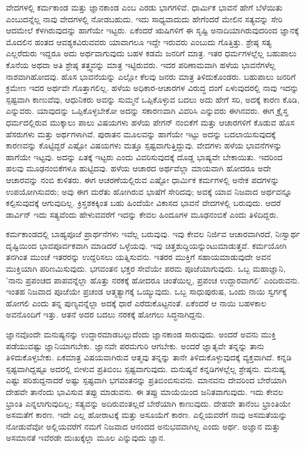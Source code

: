 \newpage

ವೇದಗಳಲ್ಲಿ ಕರ್ಮಕಾಂಡ ಮತ್ತು ಜ್ಞಾನಕಾಂಡ ಎಂಬ ಎರಡು ಭಾಗಗಳಿವೆ. ಧಾರ್ಮಿಕ ಭಾವನೆ ಹೇಗೆ ಬೆಳೆಯಿತು ಎಂಬುದನ್ನೆಲ್ಲ ನಾವು ವೇದಗಳಲ್ಲಿ ನೋಡಬಹುದು. ಇದು ಸಾಧ್ಯವಾದುದು ಹೇಗೆಂದರೆ ಮೇಲಿನ ಸತ್ಯವನ್ನು ಸೇರಿ ಆದಮೇಲೆ ಕೆಳಗಿರುವುದನ್ನು ಹಾಗೆಯೇ ಇಟ್ಟರು. ಏಕೆಂದರೆ ಋಷಿಗಳಿಗೆ ಈ ಸೃಷ್ಟಿ ಅನಾದಿಯಾಗಿರುವುದರಿಂದ ಜ್ಞಾನಕ್ಕೆ ಮೊದಲಿನ ಹಂತದ ಆವಶ್ಯಕವಿರುವವರು ಯಾವಾಗಲೂ ಇದ್ದೇ ಇರುವರು ಎಂಬುದು ಗೊತ್ತಿತ್ತು. ಶ್ರೇಷ್ಠ ಸತ್ಯ ಎಲ್ಲರೆದುರು ಇದ್ದರೂ ಅದು ಅರ್ಥವಾಗುವುದು ಬಹಳ ಕಡಮೆ ಜನರಿಗೆ ಮಾತ್ರ. ಇತರ ಧರ್ಮಗಳಲ್ಲೆಲ್ಲ ಬಹುಪಾಲು ಕೊನೆಯ ಅಥವಾ ಅತಿ ಶ್ರೇಷ್ಠ ತತ್ತ್ವವನ್ನು ಮಾತ್ರ ಇಟ್ಟಿರುವರು. ಇದರ ಪರಿಣಾಮವಾಗಿ ಹಳೆಯ ಭಾವನೆಗಳೆಲ್ಲ ನಾಶವಾಗಿಹೋದವು. ಹೊಸ ಭಾವನೆಯನ್ನು ಎಲ್ಲೋ ಕೆಲವು ಜನರು ಮಾತ್ರ ತಿಳಿದುಕೊಂಡರು. ಬಹುಪಾಲು ಜನರಿಗೆ ಕ್ರಮೇಣ ಇದರ ಅರ್ಥವೇ ಗೊತ್ತಾಗಲಿಲ್ಲ. ಹಳೆಯ ಅಧಿಕಾರ-ಆಚಾರಗಳ ವಿರುದ್ಧ ದಂಗೆ ಏಳುವುದರಲ್ಲಿ ನಾವು ಇದನ್ನು ಸ್ಪಷ್ಟವಾಗಿ ಕಾಣುವೆವು, ಆಧುನಿಕರು ಅವನ್ನು ಸುಮ್ಮನೆ ಒಪ್ಪಿಕೊಳ್ಳುವ ಬದಲು ಅದು ಹೇಗೆ ಸರಿ, ಅದಕ್ಕೆ ಕಾರಣ ಕೊಡಿ, ಎನ್ನುವರು. ಯಾವುದನ್ನು ಒಪ್ಪಿಕೊಳ್ಳಬೇಕೋ ಅದನ್ನು ಸಕಾರಣವಾಗಿ ವಿವರಿಸಿ ಎನ್ನುವರು ಈಗಿನವರು. ಈಗ ಕ್ರೈಸ್ತ ಧರ್ಮದಲ್ಲಿರುವ ಮುಕ್ಕಾಲು ಪಾಲು ವಿಷಯಗಳು ಹಳೆಯ ಪೇಗನ್ ನಂಬಿಕೆಗೆ ಮತ್ತು ಆಚಾರಗಳಿಗೆ ಕೊಡುವ ಹೊಸ ಹೆಸರುಗಳು ಮತ್ತು ಅರ್ಥಗಳಾಗಿವೆ. ಪುರಾತನ ಮೂಲವನ್ನು ಹಾಗೆಯೇ ಇಟ್ಟು ಅದನ್ನು ಬದಲಾಯಿಸುವುದಕ್ಕೆ ಕಾರಣವನ್ನು ಕೊಟ್ಟಿದ್ದರೆ ಎಷ್ಟೋ ವಿಷಯಗಳು ಮತ್ತೂ ಸ್ಪಷ್ಟವಾಗುತ್ತಿದ್ದುವು. ವೇದಗಳು ಹಳೆಯ ಭಾವನೆಗಳನ್ನು ಹಾಗೆಯೇ ಇಟ್ಟವು. ಅದನ್ನು ಏತಕ್ಕೆ ಇಟ್ಟರು ಎಂದು ವಿವರಿಸುವುದಕ್ಕೆ ದೊಡ್ಡ ಭಾಷ್ಯವೇ ಬೇಕಾಯಿತು. ಇದರಿಂದ ಹಲವು ಮೂಢನಂಬಿಕೆಗಳೂ ಹುಟ್ಟಿದವು. ಹಳೆಯ ಆಚಾರದ ಅರ್ಥವೆಲ್ಲಾ ಮಾಯವಾಗಿ ಹೋದರೂ ಅದೇ ಆಚಾರವನ್ನು ನಂಬಿ ಕುಳಿತರು. ಈಗ ಆಚರಣೆಯಲ್ಲಿರುವ ಎಷ್ಟೋ ಧಾರ್ಮಿಕ ಕರ್ಮಗಳಲ್ಲಿ ಅನೇಕ ಪದಗಳನ್ನು ಉಪಯೋಗಿಸುವರು; ಅವು ಈಗ ಮರೆತು ಹೋಗಿರುವ ಭಾಷೆಗೆ ಸೇರಿದವು; ಅವಕ್ಕೆ ಯಾವ ನಿಜವಾದ ಅರ್ಥವನ್ನೂ ಕಲ್ಪಿಸುವುದಕ್ಕೆ ಆಗುವುದಿಲ್ಲ. ಕ್ರಿಸ್ತಶಕಕ್ಕಿಂತ ಬಹು ಹಿಂದೆಯೇ ವಿಕಾಸದ ಭಾವನೆ ವೇದಗಳಲ್ಲಿ ಬರುವುದು. ಆದರೆ ಡಾರ್ವಿನ್ ಇದು ಸತ್ಯವೆಂದು ಹೇಳುವವರೆಗೆ ಇದನ್ನು ಕೇವಲ ಹಿಂದೂಗಳ ಮೂಢನಂಬಿಕೆ ಎಂದು ತಿಳಿದಿದ್ದರು.

ಕರ್ಮಕಾಂಡದಲ್ಲಿ ಬಾಹ್ಯಪೂಜೆ ಪ್ರಾರ್ಥನೆಗಳು ಇವೆಲ್ಲ ಬರುವುವು. ಇವು ಕೇವಲ ನಿರ್ಜಿವ ಆಚಾರವಾಗಿರದೆ, ನಿಃಸ್ವಾರ್ಥ ದೃಷ್ಟಿಯಿಂದ ಭಾವಪೂರ್ವಕವಾಗಿ ಮಾಡಿದರೆ ಒಳ್ಳೆಯವು. ಇವು ಚಿತ್ತಶುದ್ದಿಯನ್ನುಂಟುಮಾಡುತ್ತವೆ. ಕರ್ಮಯೋಗಿ ತನಗಿಂತ ಮುಂಚೆ ಇತರರನ್ನು ಉದ್ದರಿಸಲು ಯತ್ನಿಸುವನು. ಇತರರ ಮುಕ್ತಿಗೆ ಸಹಾಯಮಾಡುವುದೇ ಅವನ ಮುಕ್ತಿಯಾಗಿ ಪರಿಣಮಿಸುವುದು. ಭಗವಂತನ ಭಕ್ತರ ಸೇವೆಯೇ ಪರಮ ಪೂಜೆಯಾಗುವುದು. ಒಬ್ಬ ಮಹಾಜ್ಞಾನಿ, 'ನಾನು ಪ್ರಪಂಚದ ಪಾಪವನ್ನೆಲ್ಲಾ ಹೊತ್ತು ನರಕಕ್ಕೆ ಹೋದರೂ ಚಿಂತೆಯಿಲ್ಲ, ಪ್ರಪಂಚ ಉದ್ದಾರವಾಗಲಿ' ಎಂದಿರುವನು. ಇಂತಹ ನಿಜವಾದ ಪೂಜೆಯೇ ಪ್ರಚಂಡ ಆತ್ಮತ್ಯಾಗಕ್ಕೆ ಒಯ್ಯುವುದು. ಒಬ್ಬ ಸಾಧುಪುರುಷ, ಒಂದು ನಾಯಿ ಸ್ವರ್ಗಕ್ಕೆ ಹೋಗಲಿ ಎಂದು ತನ್ನ ಪುಣ್ಯವನ್ನೆಲ್ಲಾ ಅದಕ್ಕೆ ಧಾರೆ ಎರೆದುಕೊಟ್ಟನಂತೆ. ಏಕೆಂದರೆ ಆ ನಾಯಿ ಬಹಳಕಾಲ ಅವನೊಂದಿಗೆ ಇತ್ತು. ಆತನೆ ಅದರ ಬದಲು ನರಕಕ್ಕೆ ಹೋಗಲು ಸಿದ್ಧನಾಗಿದ್ದನು.

ಜ್ಞಾನವೊಂದೇ ಮನುಷ್ಯನನ್ನು ಉದ್ಧಾರಮಾಡಬಲ್ಲುದೆಂದು ಜ್ಞಾನಕಾಂಡ ಸಾರುವುದು. ಅಂದರೆ ಅವನು ಮುಕ್ತಿ ಪಡೆಯುವಷ್ಟು ಜ್ಞಾನಿಯಾಗಬೇಕು. ಜ್ಞಾನವೇ ಪರಮಗುರಿ ಆಗಬೇಕು. ಅಂದರೆ ಜ್ಞಾತೃವೇ ತನ್ನನ್ನು ತಾನು ತಿಳಿದುಕೊಳ್ಳಬೇಕು. ಏಕಮಾತ್ರ ವಿಷಯವಾಗಿರುವ ಆತ್ಮವು ತನ್ನನ್ನು ತಾನೇ ತಿಳಿದುಕೊಳ್ಳುವುದಕ್ಕೆ ವ್ಯಕ್ತವಾಗಿದೆ. ಕನ್ನಡಿ ಸ್ಪಷ್ಟವಾಗಿದ್ದಷ್ಟೂ ಅದರಲ್ಲಿ ಬೀಳುವ ಪ್ರತಿಬಿಂಬ ಸ್ಪಷ್ಟವಾಗುವುದು. ಮನುಷ್ಯನೆ ಕನ್ನಡಿಗಳಲ್ಲೆಲ್ಲ ಶ್ರೇಷ್ಠನು. ಮನುಷ್ಯ ಎಷ್ಟು ಪರಿಶುದ್ದನಾದರೆ ಅಷ್ಟು ಸ್ಪಷ್ಟವಾಗಿ ಭಗವಂತನನ್ನು ಪ್ರತಿಬಿಂಬಿಸುವನು. ಮಾನವನು ದೇವರಿಂದ ಬೇರೆಯಾಗಿ ದೇಹವೇ ತಾನೆಂದು ಭಾವಿಸುವ ತಪ್ಪು ಮಾಡುವನು. ಈ ತಪ್ಪು ಮಾಯೆಯಿಂದ ಜನಿತವಾಗುವುದು. ಇದು ಕೇವಲ ಭ್ರಾಂತಿ ಎನ್ನಲಾಗುವುದಿಲ್ಲ; ಸತ್ಯವನ್ನು ಅದಿರುವಂತಲ್ಲದೆ ಬೇರೆಯಾಗಿ ಕಾಣುವುದು. ದೇಹವೇ ತಾನೆಂಬ ಭ್ರಾಂತಿಯೇ ಅಸಮತೆಗೆ ಕಾರಣ. ಇದೇ ಎಲ್ಲ ಹೋರಾಟಕ್ಕೆ ಮತ್ತು ಅಸೂಯೆಗೆ ಕಾರಣ. ಎಲ್ಲಿಯವರೆಗೆ ನಾವು ಅಸಮತೆಯನ್ನು ನೋಡುವೆವೋ ಅಲ್ಲಿಯವರೆಗೆ ನಮಗೆ ನಿಜವಾದ ಆನಂದದ ಅನುಭವವಾಗಿಲ್ಲ ಎಂದು ಅರ್ಥ. ಅಜ್ಞಾನ ಮತ್ತು ಅಸಮಾನತೆ ಇವೆರಡೇ ದುಃಖಕ್ಕೆಲ್ಲಾ ಮೂಲ ಎನ್ನುವುದು ಜ್ಞಾನ.

